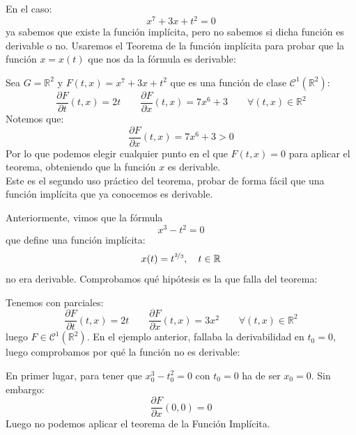 \begin{ejemplo}
    En el caso:
    \begin{equation*}
        x^7+3x+t^2 = 0
    \end{equation*}
    ya sabemos que existe la función implícita, pero no sabemos si dicha función es derivable o no. Usaremos el Teorema de la función implícita para probar que la función $x=x(t)$ que nos da la fórmula es derivable:

    \noindent
    Sea $G = \mathbb{R}^2$ y $F(t,x) = x^7+3x+t^2$ que es una función de clase $\mathcal{C}^1(\mathbb{R}^2)$:
    \begin{equation*}
        \dfrac{\partial F}{\partial t}(t,x) = 2t \qquad \dfrac{\partial F}{\partial x}(t,x) = 7x^6 + 3 \qquad \forall (t,x)\in \mathbb{R}^2
    \end{equation*}
    Notemos que:
    \begin{equation*}
        \dfrac{\partial F}{\partial x}(t,x) = 7x^6 + 3 > 0
    \end{equation*}
    Por lo que podemos elegir cualquier punto en el que $F(t,x) = 0$ para aplicar el teorema, obteniendo que la función $x$ es derivable.\\

    Este es el segundo uso práctico del teorema, probar de forma fácil que una función implícita que ya conocemos es derivable.
\end{ejemplo}

\begin{ejemplo}
    Anteriormente, vimos que la fórmula
    \begin{equation*}
        x^3-t^2 = 0
    \end{equation*}
    que define una función implícita:
    \begin{equation*}
        x(t) = t^{\nicefrac{2}{3}}, \quad t\in \mathbb{R}
    \end{equation*}
    no era derivable. Comprobamos qué hipótesis es la que falla del teorema:

    \noindent
    Tenemos
    con parciales:
    \begin{equation*}
        \dfrac{\partial F}{\partial t}(t,x) = 2t \qquad \dfrac{\partial F}{\partial x}(t,x) = 3x^2 \qquad \forall (t,x)\in \mathbb{R}^2
    \end{equation*}
    luego $F\in \mathcal{C}^1(\mathbb{R}^2)$. En el ejemplo anterior, fallaba la derivabilidad en $t_0 = 0$, luego comprobamos por qué la función no es derivable:

    \noindent
    En primer lugar, para tener que $x_0^3 - t_0^2 = 0$ con $t_0 = 0$ ha de ser $x_0 = 0$. Sin embargo:
    \begin{equation*}
        \dfrac{\partial F}{\partial x}(0,0) = 0
    \end{equation*}
    Luego no podemos aplicar el teorema de la Función Implícita.
\end{ejemplo}

